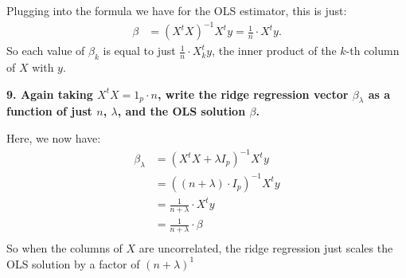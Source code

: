\documentclass[12pt,hidelinks]{article}
\numberwithin{equation}{section}
\begin{document}
Plugging into the formula we have for the OLS estimator, this is just:
\begin{align}
\beta &= (X^t X)^{-1} X^t y = \frac{1}{n} \cdot X^t y.
\end{align}
So each value of $\beta_k$ is equal to just $\frac{1}{n} \cdot X_k^t y$,
the inner product of the $k$-th column of $X$ with $y$.

\vspace*{12pt}

\textbf{9. Again taking $X^t X = 1_p \cdot n$, write the ridge regression vector
$\beta_\lambda$ as a function of just $n$, $\lambda$, and the OLS solution $\beta$.}

\vspace*{12pt}

Here, we now have:
\begin{align}
\beta_\lambda &= (X^t X + \lambda I_p)^{-1} X^t y\\
&= ((n + \lambda) \cdot I_p)^{-1} X^t y \\
&= \frac{1}{n+\lambda} \cdot X^t y \\
&= \frac{1}{n+\lambda} \cdot \beta \\
\end{align}
So when the columns of $X$ are uncorrelated, the ridge regression just scales
the OLS solution by a factor of $(n + \lambda)^{1}$
\end{document}
